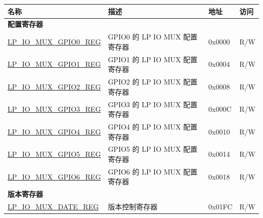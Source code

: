\begin{longtable}{ | p{6cm} | p{7.2cm} | p{1.3cm} | p{1cm} | }
\hline\rowcolor{lightgray}
\textbf{名称} & \textbf{描述} &  \textbf{地址} & \textbf{访问} \\ \hline
\endhead
\multicolumn{4}{|l|}{\textbf{配置寄存器}} \\ \hline
\hyperref[regdesc:LPIOMUXGPIONREG]{LP\_IO\_MUX\_GPIO0\_REG} & GPIO0 的 LP IO MUX 配置寄存器 & 0x0000 & R/W \\ \hline
\hyperref[regdesc:LPIOMUXGPIONREG]{LP\_IO\_MUX\_GPIO1\_REG} & GPIO1 的 LP IO MUX 配置寄存器 & 0x0004 & R/W \\ \hline
\hyperref[regdesc:LPIOMUXGPIONREG]{LP\_IO\_MUX\_GPIO2\_REG} & GPIO2 的 LP IO MUX 配置寄存器 & 0x0008 & R/W \\ \hline
\hyperref[regdesc:LPIOMUXGPIONREG]{LP\_IO\_MUX\_GPIO3\_REG} & GPIO3 的 LP IO MUX 配置寄存器 & 0x000C & R/W \\ \hline
\hyperref[regdesc:LPIOMUXGPIONREG]{LP\_IO\_MUX\_GPIO4\_REG} & GPIO4 的 LP IO MUX 配置寄存器 & 0x0010 & R/W \\ \hline
\hyperref[regdesc:LPIOMUXGPIONREG]{LP\_IO\_MUX\_GPIO5\_REG} & GPIO5 的 LP IO MUX 配置寄存器 & 0x0014 & R/W \\ \hline
\hyperref[regdesc:LPIOMUXGPIONREG]{LP\_IO\_MUX\_GPIO6\_REG} & GPIO6 的 LP IO MUX 配置寄存器 & 0x0018 & R/W \\ \hline
\multicolumn{4}{|l|}{\textbf{版本寄存器}} \\ \hline
\hyperref[regdesc:LPIOMUXDATEREG]{LP\_IO\_MUX\_DATE\_REG} & 版本控制寄存器 & 0x01FC & R/W \\ \hline
\end{longtable}
